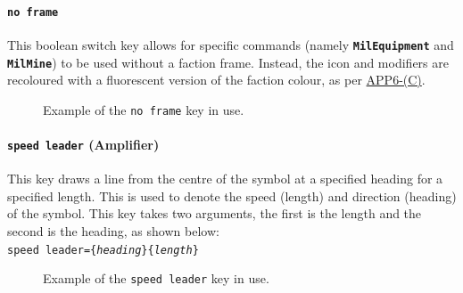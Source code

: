 \documentclass[a4paper, titlepage]{article}
\newcommand\DocLink{\href{https://www.awl.edu.pl/images/en/APP_6_C.pdf}{APP6-(C)}}
\begin{document}
\paragraph{\texttt{no frame}}

This boolean switch key allows for specific commands (namely \textbf{\texttt{MilEquipment}} and \textbf{\texttt{MilMine}}) to be used without a faction frame. Instead, the icon and modifiers are recoloured with a fluorescent version of the faction colour, as per \DocLink.

\begin{figure}[H]
\centering
{}
\caption{Example of the \texttt{no frame} key in use.}
\end{figure}

\paragraph{\texttt{speed leader} (Amplifier)}

This key draws a line from the centre of the symbol at a specified heading for a specified length. This is used to denote the speed (length) and direction (heading) of the symbol. This key takes two arguments, the first is the length and the second is the heading, as shown below:\\

\texttt{speed leader=\{\textit{heading}\}\{\textit{length}\}}

\begin{figure}[H]
\centering
{}
\caption{Example of the \texttt{speed leader} key in use.}
\end{figure}
\end{document}
